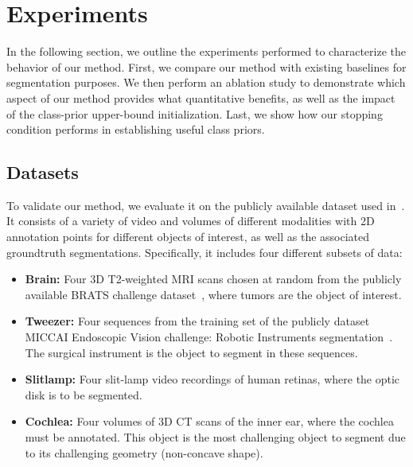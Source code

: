 \section{Experiments}
\label{sec:exps}

In the following section, we outline the experiments performed to characterize the behavior of our method. First, we compare our method with existing baselines for segmentation purposes. We then perform an ablation study to demonstrate which aspect of our method provides what quantitative benefits, as well as the impact of the class-prior upper-bound initialization. Last, we show how our stopping condition performs in establishing useful class priors.

\subsection{Datasets}
To validate our method, we evaluate it on the publicly available dataset used in~\cite{lejeune18}. It consists of a variety of video and volumes of different modalities with 2D annotation points for different objects of interest, as well as the associated groundtruth segmentations. Specifically, it includes four different subsets of data:
\begin{itemize}
\item \textbf{Brain:} Four 3D T2-weighted MRI scans chosen at random from the publicly available BRATS challenge dataset~\cite{menze15}, where tumors are the object of interest.
\item \textbf{Tweezer:} Four sequences from the training set of the publicly dataset MICCAI Endoscopic Vision challenge: Robotic Instruments segmentation~\cite{endochal}. The surgical instrument is the object to segment in these sequences.
\item \textbf{Slitlamp:} Four slit-lamp video recordings of human retinas, where the optic disk is to be segmented.
\item \textbf{Cochlea:} Four volumes of 3D CT scans of the inner ear, where the cochlea must be annotated. This object is the most challenging object to segment due to its challenging geometry (\ie non-concave shape).
\end{itemize}


